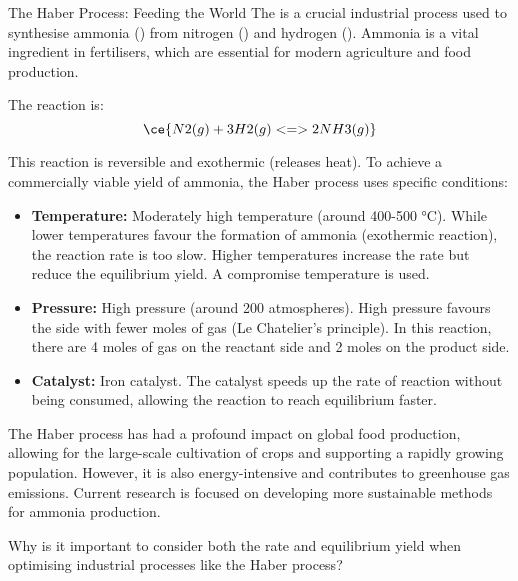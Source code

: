 \begin{keyconcept}{The Haber Process: Feeding the World}
The  is a crucial industrial process used to synthesise ammonia () from nitrogen () and hydrogen (). Ammonia is a vital ingredient in fertilisers, which are essential for modern agriculture and food production.

The reaction is:
\[\ce{N2(g) + 3H2(g) <=> 2NH3(g)}\]

This reaction is reversible and exothermic (releases heat). To achieve a commercially viable yield of ammonia, the Haber process uses specific conditions:

\begin{itemize}
    \item \textbf{Temperature:} Moderately high temperature (around 400-500 °C).  While lower temperatures favour the formation of ammonia (exothermic reaction), the reaction rate is too slow. Higher temperatures increase the rate but reduce the equilibrium yield. A compromise temperature is used.
    \item \textbf{Pressure:} High pressure (around 200 atmospheres).  High pressure favours the side with fewer moles of gas (Le Chatelier's principle). In this reaction, there are 4 moles of gas on the reactant side and 2 moles on the product side.
    \item \textbf{Catalyst:}  Iron catalyst.  The catalyst speeds up the rate of reaction without being consumed, allowing the reaction to reach equilibrium faster.
\end{itemize}

The Haber process has had a profound impact on global food production, allowing for the large-scale cultivation of crops and supporting a rapidly growing population. However, it is also energy-intensive and contributes to greenhouse gas emissions.  Current research is focused on developing more sustainable methods for ammonia production.
\end{keyconcept}

\begin{stopandthink}
Why is it important to consider both the rate and equilibrium yield when optimising industrial processes like the Haber process?
\end{stopandthink}

